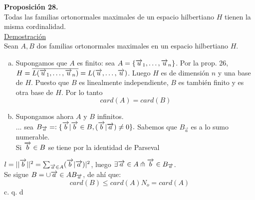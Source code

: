 \textbf{Proposición 28.} \\
Todas las familias ortonormales maximales de un espacio hilbertiano $H$ tienen la misma cordinalidad.  \\
\underline{Demostración} \\
Sean $A,B$ dos familias ortonormales maximales en un espacio hilbertiano $H$. 
\begin{enumerate}[a)]
\item Supongamos que $A$ es finito: sea $A= \lbrace \overrightarrow{u}_1,\ldots, \overrightarrow{u}_n \rbrace$. Por la prop. 26, $H= \overline{L (\overrightarrow{u}_1,\ldots, \overrightarrow{u}_n)}=L(\overrightarrow{u}, \ldots, \overrightarrow{u})$. Luego $H$ es de dimensión $n$ y una base de $H$. Puesto que $B$ es linealmente independiente, $B$ es también finito y es otra base de $H$. Por lo tanto 
$$
card (A)=card(B)
$$
\item Supongamos ahora $A$ y $B$ infinitos. \\
... sea $B_{\overrightarrow{a}}=:\lbrace \overrightarrow{b} | \overrightarrow{b} \in B, (\overrightarrow{b}| \overrightarrow{a}) \neq 0 \rbrace.$ Sabemos que $B_{\overrightarrow{a}}$ es a lo sumo numerable. \\
Si $\overrightarrow{b} \in B$ se tiene por la identidad de Parseval
\end{enumerate}
$l= || \overrightarrow{b} ||^2=\sum_{\overrightarrow{a} \in A}(\overrightarrow{b}|\overrightarrow{a})|^2$, luego $ \exists \overrightarrow{a} \in A \pitchfork \overrightarrow{b} \in B_{\overrightarrow{a}}$. \\
Se sigue $B=\cup{\overrightarrow{a} \ensuremath{\in}A}B_{\overrightarrow{a}}$, de ahí que:
$$
card(B) \leq card(A) N_o=card(A)
$$
 \phantom{sssssssssssssssssssssssssssssssssss sasdasdasdasdadadssada} c. q. d \\ \\
 
